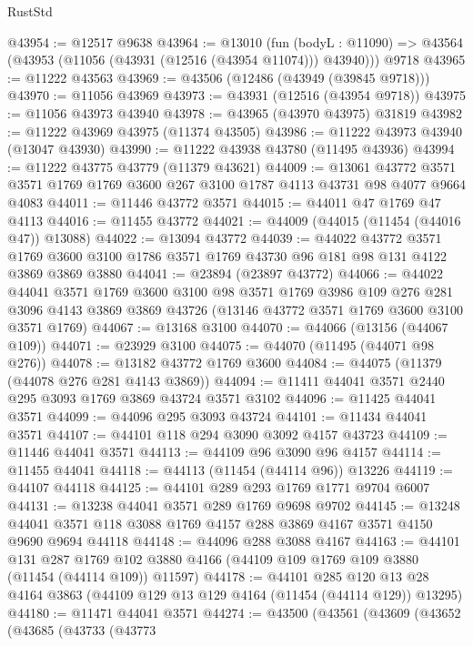 \begin{lexlean}{RustStd}
\begin{coremodule}
@43954 := @12517 @9638
@43964 := @13010
    (fun (bodyL : @11090) => @43564 (@43953 (@11056 (@43931 (@12516 (@43954 @11074))) @43940)))
    @9718
@43965 := @11222 @43563
@43969 := @43506 (@12486 (@43949 (@39845 @9718)))
@43970 := @11056 @43969
@43973 := @43931 (@12516 (@43954 @9718))
@43975 := @11056 @43973 @43940
@43978 := @43965 (@43970 @43975) @31819
@43982 := @11222 @43969 @43975 (@11374 @43505)
@43986 := @11222 @43973 @43940 (@13047 @43930)
@43990 := @11222 @43938 @43780 (@11495 @43936)
@43994 := @11222 @43775 @43779 (@11379 @43621)
@44009 := @13061
    @43772
    @3571
    @3571
    @1769
    @1769
    @3600
    @267
    @3100
    @1787
    @4113
    @43731
    @98
    @4077
    @9664
    @4083
@44011 := @11446 @43772 @3571
@44015 := @44011 @47 @1769 @47 @4113
@44016 := @11455 @43772
@44021 := @44009 (@44015 (@11454 (@44016 @47)) @13088)
@44022 := @13094 @43772
@44039 := @44022
    @43772
    @3571
    @1769
    @3600
    @3100
    @1786
    @3571
    @1769
    @43730
    @96
    @181
    @98
    @131
    @4122
    @3869
    @3869
    @3880
@44041 := @23894 (@23897 @43772)
@44066 := @44022
    @44041
    @3571
    @1769
    @3600
    @3100
    @98
    @3571
    @1769
    @3986
    @109
    @276
    @281
    @3096
    @4143
    @3869
    @3869
    @43726
    (@13146 @43772 @3571 @1769 @3600 @3100 @3571 @1769)
@44067 := @13168 @3100
@44070 := @44066 (@13156 (@44067 @109))
@44071 := @23929 @3100
@44075 := @44070 (@11495 (@44071 @98 @276))
@44078 := @13182 @43772 @1769 @3600
@44084 := @44075 (@11379 (@44078 @276 @281 @4143 @3869))
@44094 := @11411 @44041 @3571 @2440 @295 @3093 @1769 @3869 @43724 @3571 @3102
@44096 := @11425 @44041 @3571
@44099 := @44096 @295 @3093 @43724
@44101 := @11434 @44041 @3571
@44107 := @44101 @118 @294 @3090 @3092 @4157 @43723
@44109 := @11446 @44041 @3571
@44113 := @44109 @96 @3090 @96 @4157
@44114 := @11455 @44041
@44118 := @44113 (@11454 (@44114 @96)) @13226
@44119 := @44107 @44118
@44125 := @44101 @289 @293 @1769 @1771 @9704 @6007
@44131 := @13238 @44041 @3571 @289 @1769 @9698 @9702
@44145 := @13248 @44041 @3571 @118 @3088 @1769 @4157 @288 @3869 @4167 @3571 @4150 @9690 @9694 @44118
@44148 := @44096 @288 @3088 @4167
@44163 := @44101
    @131
    @287
    @1769
    @102
    @3880
    @4166
    (@44109 @109 @1769 @109 @3880 (@11454 (@44114 @109)) @11597)
@44178 := @44101
    @285
    @120
    @13
    @28
    @4164
    @3863
    (@44109 @129 @13 @129 @4164 (@11454 (@44114 @129)) @13295)
@44180 := @11471 @44041 @3571
@44274 := @43500
    (@43561
      (@43609
        (@43652
          (@43685
            (@43733
              (@43773

\end{coremodule}
\end{lexlean}
